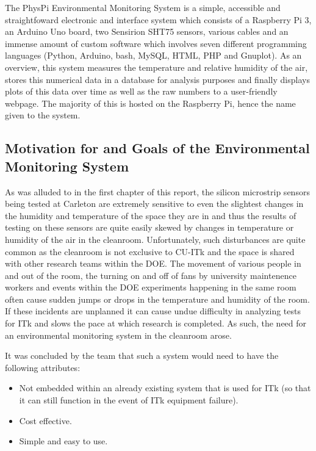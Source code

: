\documentclass[letterpaper, 11pt]{report}
\begin{document}
The PhysPi Environmental Monitoring System is a simple, accessible and straightfoward electronic and interface system which consists of a Raspberry Pi 3, an Arduino Uno board, two Sensirion SHT75 sensors, various cables and an immense amount of custom software which involves seven different programming languages (Python, Arduino, bash, MySQL, HTML, PHP and Gnuplot).  As an overview, this system measures the temperature and relative humidity of the air, stores this numerical data in a database for analysis purposes and finally displays plots of this data over time as well as the raw numbers to a user-friendly webpage.  The majority of this is hosted on the Raspberry Pi, hence the name given to the system.

\subsection{Motivation for and Goals of the Environmental Monitoring System}

As was alluded to in the first chapter of this report, the silicon microstrip sensors being tested at Carleton are extremely sensitive to even the slightest changes in the humidity and temperature of the space they are in and thus the results of testing on these sensors are quite easily skewed by changes in temperature or humidity of the air in the cleanroom.  Unfortunately, such disturbances are quite common as the cleanroom is not exclusive to CU-ITk and the space is shared with other research teams within the DOE.  The movement of various people in and out of the room, the turning on and off of fans by university maintenence workers and events within the DOE experiments happening in the same room often cause sudden jumps or drops in the temperature and humidity of the room.  If these incidents are unplanned it can cause undue difficulty in analyzing tests for ITk and slows the pace at which research is completed.  As such, the need for an environmental monitoring system in the cleanroom arose.

It was concluded by the team that such a system would need to have the following attributes:
\begin{itemize}
\item Not embedded within an already existing system that is used for ITk (so that it can still function in the event of ITk equipment failure).
\item Cost effective.
\item Simple and easy to use.
\end{itemize}
\end{document}

